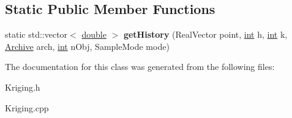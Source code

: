 \subsection*{Static Public Member Functions}
\begin{DoxyCompactItemize}
\item 
static std\+::vector$<$ \hyperlink{classdouble}{double} $>$ {\bfseries get\+History} (Real\+Vector point, \hyperlink{classint}{int} h, \hyperlink{classint}{int} k, \hyperlink{classArchive}{Archive} arch, \hyperlink{classint}{int} n\+Obj, Sample\+Mode mode)\hypertarget{classKriging_afe24b14d0fce5989eb84755278f4ea37}{}\label{classKriging_afe24b14d0fce5989eb84755278f4ea37}

\end{DoxyCompactItemize}


The documentation for this class was generated from the following files\+:\begin{DoxyCompactItemize}
\item 
Kriging.\+h\item 
Kriging.\+cpp\end{DoxyCompactItemize}
